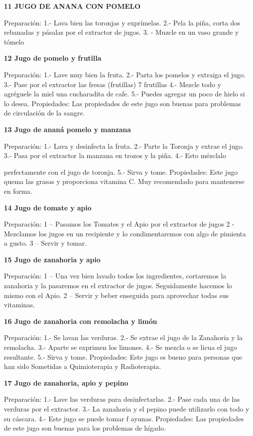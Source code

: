 \textbf{11 JUGO DE ANANA CON POMELO}

Preparación: 1.- Lava bien las toronjas y exprímelas. 2.- Pela la piña,
corta dos rebanadas y pásalas por el extractor de jugos. 3. - Muzcle en
un vaso grande y tómelo

\textbf{12 Jugo de pomelo y frutilla}

Preparación: 1.- Lave muy bien la fruta. 2.- Parta los pomelos y
extraiga el jugo. 3.- Pase por el extractor las fresas (frutillas) 7
frutillas 4.- Mezcle todo y agréguele la miel una cucharadita de cafe.
5.- Puedes agregar un poco de hielo si lo desea. Propiedades: Las
propiedades de este jugo son buenas para problemas de circulación de la
sangre.

\textbf{13 Jugo de ananá pomelo y manzana}

Preparación: 1.- Lava y desinfecta la fruta. 2.- Parte la Toronja y
extrae el jugo. 3.- Pasa por el extractor la manzana en trozos y la
piña. 4.- Esto mézclalo

perfectamente con el jugo de toronja. 5.- Sirva y tome. Propiedades:
Este jugo quema las grasas y proporciona vitamina C. Muy recomendado
para mantenerse en forma.

\textbf{14 Jugo de tomate y apio}

Preparación: 1 -- Pasamos los Tomates y el Apio por el extractor de
jugos 2 - Mezclamos los jugos en un recipiente y lo condimentaremos con
algo de pimienta a gusto. 3 -- Servir y tomar.

\textbf{15 Jugo de zanahoria y apio}

Preparación: 1 -- Una vez bien lavado todos los ingredientes, cortaremos
la zanahoria y la pasaremos en el extractor de jugos. Seguidamente
hacemos lo mismo con el Apio. 2 -- Servir y beber enseguida para
aprovechar todas sus vitaminas.

\textbf{16 Jugo de zanahoria con remolacha y limón}

Preparación: 1.- Se lavan las verduras. 2.- Se extrae el jugo de la
Zanahoria y la remolacha. 3.- Aparte se exprimen los limones. 4.- Se
mezcla o se licua el jugo resultante. 5.- Sirva y tome. Propiedades:
Este jugo es bueno para personas que han sido Sometidas a Quimioterapia
y Radioterapia.

\textbf{17 Jugo de zanahoria, apio y pepino }

Preparación: 1.- Lave las verduras para desinfectarlas. 2.- Pase cada
una de las verduras por el extractor. 3.- La zanahoria y el pepino puede
utilizarlo con todo y su cáscara. 4.- Este jugo se puede tomar f ayunas.
Propiedades: Las propiedades de este jugo son buenas para los problemas
de hígado.

